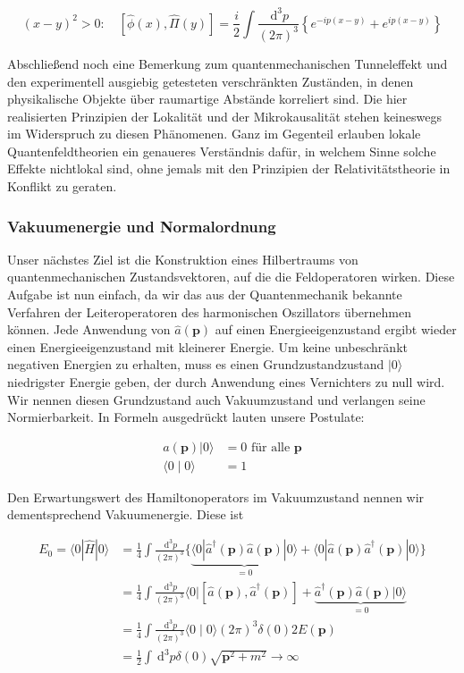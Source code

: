 \documentclass[10pt, letterpaper]{article}
\begin{document}
$$
(x-y)^{2}>0: \quad[\hat{\phi}(x), \hat{\Pi}(y)]=\frac{i}{2} \int \frac{\mathrm{~d}^{3} p}{(2 \pi)^{3}}\left\{e^{-i p(x-y)}+e^{i p(x-y)}\right\}
$$

Abschließend noch eine Bemerkung zum quantenmechanischen Tunneleffekt und den experimentell ausgiebig getesteten verschränkten Zuständen, in denen physikalische Objekte über raumartige Abstände korreliert sind. Die hier realisierten Prinzipien der Lokalität und der Mikrokausalität stehen keineswegs im Widerspruch zu diesen Phänomenen. Ganz im Gegenteil erlauben lokale Quantenfeldtheorien ein genaueres Verständnis dafür, in welchem Sinne solche Effekte nichtlokal sind, ohne jemals mit den Prinzipien der Relativitätstheorie in Konflikt zu geraten.

\subsubsection*{Vakuumenergie und Normalordnung}
Unser nächstes Ziel ist die Konstruktion eines Hilbertraums von quantenmechanischen Zustandsvektoren, auf die die Feldoperatoren wirken. Diese Aufgabe ist nun einfach, da wir das aus der Quantenmechanik bekannte Verfahren der Leiteroperatoren des harmonischen Oszillators übernehmen können. Jede Anwendung von $\hat{a}(\mathbf{p})$ auf einen Energieeigenzustand ergibt wieder einen Energieeigenzustand mit kleinerer Energie. Um keine unbeschränkt negativen Energien zu erhalten, muss es einen Grundzustandzustand $|0\rangle$ niedrigster Energie geben, der durch Anwendung eines Vernichters zu null wird. Wir nennen diesen Grundzustand auch Vakuumzustand und verlangen seine Normierbarkeit. In Formeln ausgedrückt lauten unsere Postulate:

$$
\begin{aligned}
a(\mathbf{p})|0\rangle & =0 \text { für alle } \mathbf{p} \\
\langle 0 \mid 0\rangle & =1
\end{aligned}
$$

Den Erwartungswert des Hamiltonoperators im Vakuumzustand nennen wir dementsprechend Vakuumenergie. Diese ist

$$
\begin{aligned}
E_{0}=\langle 0| \hat{H}|0\rangle & =\frac{1}{4} \int \frac{\mathrm{~d}^{3} p}{(2 \pi)^{3}}\{\underbrace{\langle 0| \hat{a}^{\dagger}(\mathbf{p}) \hat{a}(\mathbf{p})|0\rangle}_{=0}+\langle 0| \hat{a}(\mathbf{p}) \hat{a}^{\dagger}(\mathbf{p})|0\rangle\} \\
& =\frac{1}{4} \int \frac{\mathrm{~d}^{3} p}{(2 \pi)^{3}}\langle 0|\left[\hat{a}(\mathbf{p}), \hat{a}^{\dagger}(\mathbf{p})\right]+\underbrace{\hat{a}^{\dagger}(\mathbf{p}) \hat{a}(\mathbf{p})|0\rangle}_{=0} \\
& =\frac{1}{4} \int \frac{\mathrm{~d}^{3} p}{(2 \pi)^{3}}\langle 0 \mid 0\rangle(2 \pi)^{3} \delta(0) 2 E(\mathbf{p}) \\
& =\frac{1}{2} \int \mathrm{~d}^{3} p \delta(0) \sqrt{\mathbf{p}^{2}+m^{2}} \rightarrow \infty
\end{aligned}
$$
\end{document}
